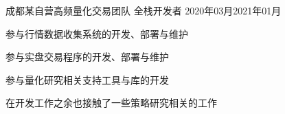 
\begin{projitem}
    {成都某自营高频量化交易团队}
    {全栈开发者}
    {2020年03月}{2021年01月}
    \item 参与行情数据收集系统的开发、部署与维护
    \item 参与实盘交易程序的开发、部署与维护
    \item 参与量化研究相关支持工具与库的开发
    \item 在开发工作之余也接触了一些策略研究相关的工作
\end{projitem}

\endinput